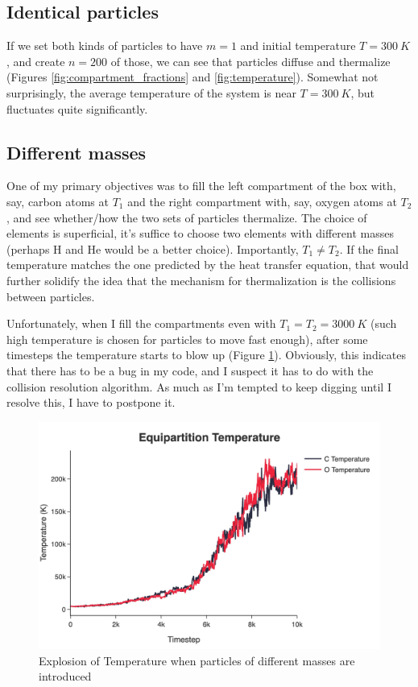 \documentclass[10pt]{article}
\begin{document}
\subsection{Identical particles}
If we set both kinds of particles to have $m=1$ and initial temperature
$T=\qty{300}{K}$, and create $n=200$ of those, we can see that particles diffuse and thermalize (Figures \ref{fig:compartment_fractions} and \ref{fig:temperature}). Somewhat not surprisingly, the average temperature of the system is near $T=\qty{300}{K}$, but fluctuates quite significantly.


\subsection{Different masses}
One of my primary objectives was to fill the left compartment of the box with, say, carbon atoms at $T_1$ and the right compartment with, say, oxygen atoms at $T_2$, and see whether/how the two sets of particles thermalize. The choice of elements is superficial, it's suffice to choose two elements with different masses (perhaps H and He would be a better choice). Importantly, $T_1\neq T_2$. If the final temperature matches the one predicted by the heat transfer equation, that would further solidify the idea that the mechanism for thermalization is the collisions between particles.

Unfortunately, when I fill the compartments even with $T_1=T_2=\qty{3000}{K}$ (such high temperature is chosen for particles to move fast enough), after some timesteps the temperature starts to blow up (Figure \ref{fig:temperature-explosion}). Obviously, this indicates that there has to be a bug in my code, and I suspect it has to do with the collision resolution algorithm. As much as I'm tempted to keep digging until I resolve this, I have to postpone it.

\begin{figure}[h]
    \centering
    \includegraphics[width=0.8\linewidth]{../figures/jpg/equipartition_temperature_explosion.jpg}
    \caption{Explosion of Temperature when particles of different masses are introduced}
    \label{fig:temperature-explosion}
\end{figure}
\end{document}
